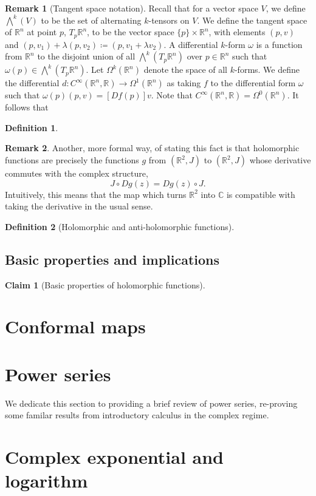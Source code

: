 \documentclass[aps,pra,showpacs,notitlepage,onecolumn,superscriptaddress,nofootinbib]{revtex4-1}
\newcommand{\Wedge}{\bigwedge}
\theoremstyle{definition}
\newtheorem{definition}{Definition}[section]
\newtheorem{remark}{Remark}[section]
\newtheorem{claim}{Claim}[section]
\newcommand{\hhrulefill}{\hspace{-1.5em} \hrulefill}
\begin{document}
\begin{remark}[Tangent space notation]
Recall that for a vector space $V$, we define $\Wedge^{k}(V)$ to be the set of alternating $k$-tensors on $V$.
We define the tangent space of $\mathbb{R}^{n}$ at point $p$, $T_p \mathbb{R}^n$, to be the vector space $\{p\} \times \mathbb{R}^{n}$, with elements $(p, v)$ and $(p, v_1) + \lambda (p, v_2) \coloneqq (p, v_1 + \lambda v_2)$.
A differential $k$-form $\omega$ is a function from $\mathbb{R}^{n}$ to the disjoint union of all $\Wedge^{k}(T_p \mathbb{R}^{n})$ over $p \in \mathbb{R}^{n}$ such that $\omega(p) \in \Wedge^{k}(T_p \mathbb{R}^{n})$. Let $\Omega^{k}(\mathbb{R}^{n})$
denote the space of all $k$-forms. We define the differential $d : C^{\infty}(\mathbb{R}^{n}, \mathbb{R}) \rightarrow \Omega^1(\mathbb{R}^n)$ as taking $f$ to the differential form $\omega$ such that $\omega(p)(p, v) = [D f(p)] v$. Note that
$C^{\infty}(\mathbb{R}^{n}, \mathbb{R}) = \Omega^0(\mathbb{R}^n)$. It follows that
\end{remark}

\begin{definition}
  \end{definition}

\begin{remark}
  Another, more formal way, of stating this fact is that holomorphic functions are precisely the functions $g$ from $(\mathbb{R}^2, J)$ to $(\mathbb{R}^2, J)$ whose derivative
  commutes with the complex structure,
  \begin{equation}
    J \circ D g(z) = D g(z) \circ J.
  \end{equation}
  Intuitively, this means that the map which turns $\mathbb{R}^2$ into $\mathbb{C}$ is compatible with taking the derivative in the usual sense.
  \end{remark}

\begin{definition}[Holomorphic and anti-holomorphic functions]
\end{definition}

\hhrulefill

\subsection{Basic properties and implications}

\begin{claim}[Basic properties of holomorphic functions]

\end{claim}

\section{Conformal maps}

\section{Power series}

\noindent We dedicate this section to providing a brief review of power series, re-proving some familar results from introductory calculus in the complex regime.

\section{Complex exponential and logarithm}

\noindent 
\end{document}
